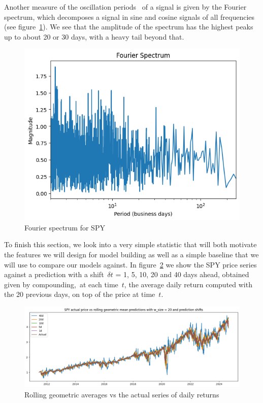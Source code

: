 \documentclass[10pt]{article}
\begin{document}
Another measure of the oscillation periods~ of a signal is given by the
Fourier spectrum, which decomposes a signal in sine and cosine signals
of all frequencies (see figure~{\ref{392293}}). We see
that the amplitude of the spectrum has the highest peaks up to about 20
or 30 days, with a heavy tail beyond that.
\begin{figure}[H]
\begin{center}
\includegraphics[width=0.70\columnwidth]{figures/output9/output9}
\caption{{Fourier spectrum for SPY
{\label{392293}}%
}}
\end{center}
\end{figure}

To finish this section, we look into a very simple statistic that will
both motivate the features we will design for model building as well as
a simple baseline that we will use to compare our models against. In
figure~{\ref{957318}} we show the SPY price series
against a prediction with a shift~\(\delta t\) = 1, 5, 10, 20 and
40 days ahead, obtained given by compounding,~at each
time~\(t\), the average daily return computed with the 20
previous days, on top of the price at time~\(t\).
\begin{figure}[H]
\begin{center}
\includegraphics[width=0.98\columnwidth]{figures/output10/output10}
\caption{{Rolling geometric averages vs the actual series of daily returns
{\label{957318}}%
}}
\end{center}
\end{figure}
\end{document}
